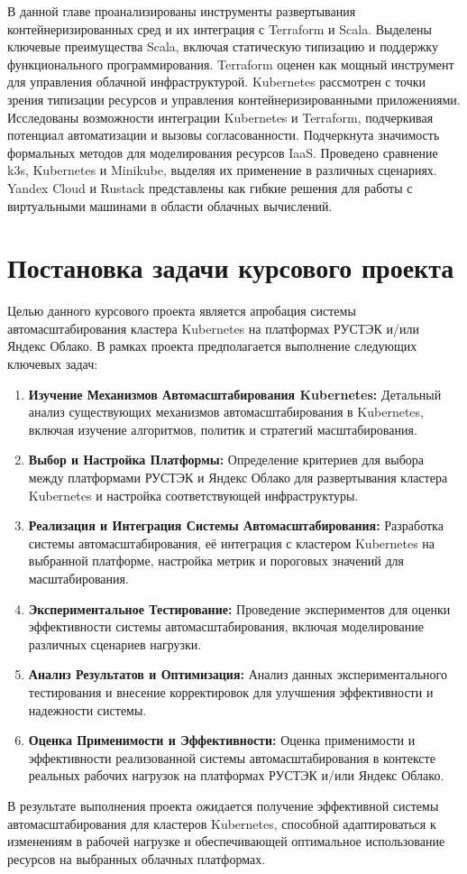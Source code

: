 В данной главе проанализированы инструменты развертывания контейнеризированных
сред и их интеграция с Terraform и Scala. Выделены ключевые преимущества Scala,
включая статическую типизацию и поддержку функционального программирования.
Terraform оценен как мощный инструмент для управления облачной инфраструктурой.
Kubernetes рассмотрен с точки зрения типизации ресурсов и управления
контейнеризированными приложениями. Исследованы возможности интеграции
Kubernetes и Terraform, подчеркивая потенциал автоматизации и вызовы
согласованности. Подчеркнута значимость формальных методов для моделирования
ресурсов IaaS. Проведено сравнение k3s, Kubernetes и Minikube, выделяя их
применение в различных сценариях. Yandex Cloud и Rustack представлены как гибкие
решения для работы с виртуальными машинами в области облачных вычислений.

\section{Постановка задачи курсового проекта}

Целью данного курсового проекта является апробация системы автомасштабирования
кластера Kubernetes на платформах РУСТЭК и/или Яндекс Облако. В рамках проекта
предполагается выполнение следующих ключевых задач:

\begin{enumerate}
  \item \textbf{Изучение Механизмов Автомасштабирования Kubernetes:} Детальный
анализ существующих механизмов автомасштабирования в Kubernetes, включая
изучение алгоритмов, политик и стратегий масштабирования.
  
  \item \textbf{Выбор и Настройка Платформы:} Определение критериев для выбора
между платформами РУСТЭК и Яндекс Облако для развертывания кластера Kubernetes и
настройка соответствующей инфраструктуры.
  
  \item \textbf{Реализация и Интеграция Системы Автомасштабирования:} Разработка
системы автомасштабирования, её интеграция с кластером Kubernetes на выбранной
платформе, настройка метрик и пороговых значений для масштабирования.
  
  \item \textbf{Экспериментальное Тестирование:} Проведение экспериментов для
оценки эффективности системы автомасштабирования, включая моделирование
различных сценариев нагрузки.
  
  \item \textbf{Анализ Результатов и Оптимизация:} Анализ данных
экспериментального тестирования и внесение корректировок для улучшения
эффективности и надежности системы.
  
  \item \textbf{Оценка Применимости и Эффективности:} Оценка применимости и
эффективности реализованной системы автомасштабирования в контексте реальных
рабочих нагрузок на платформах РУСТЭК и/или Яндекс Облако.
\end{enumerate}

В результате выполнения проекта ожидается получение эффективной системы
автомасштабирования для кластеров Kubernetes, способной адаптироваться к
изменениям в рабочей нагрузке и обеспечивающей оптимальное использование
ресурсов на выбранных облачных платформах.
